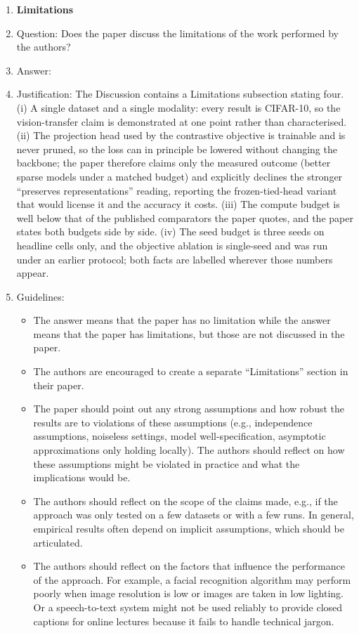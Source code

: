 \begin{enumerate}
\item {\bf Limitations}
    \item[] Question: Does the paper discuss the limitations of the work performed by the authors?
    \item[] Answer: \answerYes{}
    \item[] Justification: The Discussion contains a Limitations subsection stating four. (i) A single dataset and a single modality: every result is CIFAR-10, so the vision-transfer claim is demonstrated at one point rather than characterised. (ii) The projection head used by the contrastive objective is trainable and is never pruned, so the loss can in principle be lowered without changing the backbone; the paper therefore claims only the measured outcome (better sparse models under a matched budget) and explicitly declines the stronger ``preserves representations'' reading, reporting the frozen-tied-head variant that would license it and the accuracy it costs. (iii) The compute budget is well below that of the published comparators the paper quotes, and the paper states both budgets side by side. (iv) The seed budget is three seeds on headline cells only, and the objective ablation is single-seed and was run under an earlier protocol; both facts are labelled wherever those numbers appear.
    \item[] Guidelines:
    \begin{itemize}
        \item The answer \answerNA{} means that the paper has no limitation while the answer \answerNo{} means that the paper has limitations, but those are not discussed in the paper.
        \item The authors are encouraged to create a separate ``Limitations'' section in their paper.
        \item The paper should point out any strong assumptions and how robust the results are to violations of these assumptions (e.g., independence assumptions, noiseless settings, model well-specification, asymptotic approximations only holding locally). The authors should reflect on how these assumptions might be violated in practice and what the implications would be.
        \item The authors should reflect on the scope of the claims made, e.g., if the approach was only tested on a few datasets or with a few runs. In general, empirical results often depend on implicit assumptions, which should be articulated.
        \item The authors should reflect on the factors that influence the performance of the approach. For example, a facial recognition algorithm may perform poorly when image resolution is low or images are taken in low lighting. Or a speech-to-text system might not be used reliably to provide closed captions for online lectures because it fails to handle technical jargon.

\end{itemize}
\end{enumerate}

